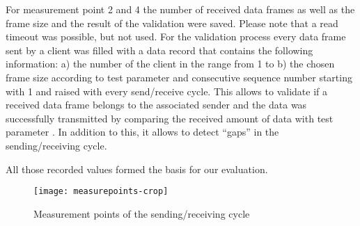\documentclass{sig-alternate}
\begin{document}
For measurement point 2 and 4 the number of received data frames as well as the 
frame size and the result of the validation were saved. Please note that a read 
timeout was possible, but not used. For the validation process every data frame 
sent by a client was filled with a data record that contains the following 
information: a) the number of the client in the range from 1 to  b) the 
chosen frame size according to test parameter  and consecutive sequence 
number starting with 1 and raised with every send/receive cycle. This allows to 
validate if a received data frame belongs to the associated sender and the data 
was successfully transmitted by comparing the received amount of data with test 
parameter . In addition to this, it allows to detect ``gaps'' in the 
sending/receiving cycle.

All those recorded values formed the basis for our evaluation.
\begin{figure}[!t]
\centering
\texttt{[image: measurepoints-crop]}
\caption{Measurement points of the sending/receiving cycle}
\label{fig:measurepoints}
\end{figure}
\end{document}
